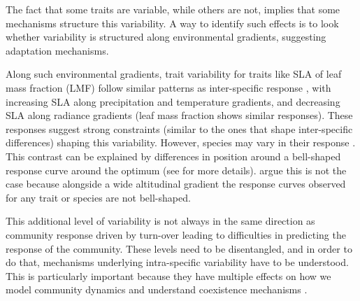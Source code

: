 



The fact that some traits are variable, while others are not, implies that some mechanisms structure this variability.
A way to identify such effects is to look whether variability is structured along environmental gradients, suggesting adaptation mechanisms.

Along such environmental gradients, trait variability for traits like SLA \parencite{poorter_causes_2009} of leaf mass fraction (LMF) \parencite{poorter_biomass_2012} follow similar patterns as inter-specific response \parencite{niinemets_global-scale_2001}, with increasing SLA along precipitation and temperature gradients, and decreasing SLA along radiance gradients (leaf mass fraction shows similar responses). These responses suggest strong constraints (similar to the ones that shape inter-specific differences) shaping this variability. However, species may vary in their response \parencite{kichenin_contrasting_2013}. This contrast can be explained by differences in position around a bell-shaped response curve around the optimum (see \citet{albert_intraspecific_2010} for more details). \citet{kichenin_contrasting_2013} argue this is not the case because alongside a wide altitudinal gradient the response curves observed for any trait or species are not bell-shaped.

This additional level of variability is not always in the same direction as community response driven by turn-over \parencite{albert_intraspecific_2010, kichenin_contrasting_2013, jung_intraspecific_2014} leading to difficulties in predicting the response of the community. These levels need to be disentangled, and in order to do that, mechanisms underlying intra-specific variability have to be understood. This is particularly important because they have multiple effects on how we model community dynamics and understand coexistence mechanisms \parencite{bolnick_why_2011, violle_return_2012}.\\
%
%
%
%

